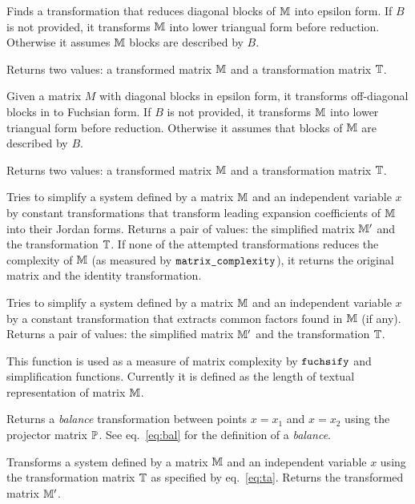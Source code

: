 \documentclass[12pt,a4paper]{article}
\begin{document}
\begin{description}[style=nextline]
Finds a transformation that reduces diagonal blocks of $\mathbb{M}$ into epsilon form.
If $B$ is not provided, it transforms $\mathbb{M}$ into lower triangual form before reduction.
Otherwise it assumes $\mathbb{M}$ blocks are described by $B$.

Returns two values: a transformed matrix $\mathbb{M}$ and a transformation matrix $\mathbb{T}$.

Given a matrix $M$ with diagonal blocks in epsilon form, it transforms off-diagonal blocks in to Fuchsian form.
If $B$ is not provided, it transforms $\mathbb{M}$ into lower triangual form before reduction.
Otherwise it assumes that blocks of $\mathbb{M}$ are described by $B$.

Returns two values: a transformed matrix $\mathbb{M}$ and a transformation matrix $\mathbb{T}$.

Tries to simplify a system defined by a matrix $\mathbb{M}$ and an independent variable $x$ by constant transformations that transform leading expansion coefficients of $\mathbb{M}$ into their Jordan forms.
Returns a pair of values: the simplified matrix $\mathbb{M}'$ and the transformation $\mathbb{T}$.
If none of the attempted transformations reduces the complexity of $\mathbb{M}$ (as measured by $\texttt{matrix\_complexity}$), it returns the original matrix and the identity transformation.

Tries to simplify a system defined by a matrix $\mathbb{M}$ and an independent variable $x$ by a constant transformation that extracts common factors found in $\mathbb{M}$ (if any).
Returns a pair of values: the simplified matrix $\mathbb{M}'$ and the transformation $\mathbb{T}$.

This function is used as a measure of matrix complexity by $\texttt{fuchsify}$ and simplification functions.
Currently it is defined as the length of textual representation of matrix $\mathbb{M}$.

Returns a \textit{balance} transformation between points $x=x_1$ and $x=x_2$ using the projector matrix $\mathbb{P}$.
See eq.~\eqref{eq:bal} for the definition of a \textit{balance}.

Transforms a system defined by a matrix $\mathbb{M}$ and an independent variable $x$ using the transformation matrix $\mathbb{T}$ as specified by eq.~\eqref{eq:ta}.
Returns the transformed matrix $\mathbb{M}'$.


\end{description}
\end{document}
